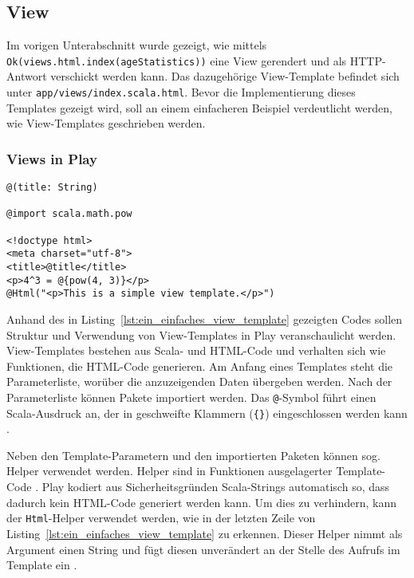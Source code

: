 

\subsection{View} %
\label{sub:view}

Im vorigen Unterabschnitt wurde gezeigt, wie mittels \lstinline|Ok(views.html.index(ageStatistics))| eine View gerendert und als HTTP-Antwort verschickt werden kann.
Das dazugehörige View-Template befindet sich unter \lstinline|app/views/index.scala.html|.
Bevor die Implementierung dieses Templates gezeigt wird, soll an einem einfacheren Beispiel verdeutlicht werden, wie View-Templates geschrieben werden.

\subsubsection{Views in Play} %
\label{ssub:views_in_play}

\begin{lstlisting}[caption=Ein einfaches View-Template, label=lst:ein_einfaches_view_template]
@(title: String)

@import scala.math.pow

<!doctype html>
<meta charset="utf-8">
<title>@title</title>
<p>4^3 = @{pow(4, 3)}</p>
@Html("<p>This is a simple view template.</p>")
\end{lstlisting}

Anhand des in Listing~\ref{lst:ein_einfaches_view_template} gezeigten Codes sollen Struktur und Verwendung von View-Templates in Play veranschaulicht werden.
View-Templates bestehen aus Scala- und HTML-Code und verhalten sich wie Funktionen, die HTML-Code generieren.
Am Anfang eines Templates steht die Parameterliste, worüber die anzuzeigenden Daten übergeben werden.
Nach der Parameterliste können Pakete importiert werden.
Das \lstinline|@|-Symbol führt einen Scala-Ausdruck an, der in geschweifte Klammern (\lstinline|{}|) eingeschlossen werden kann \cite[vgl.][]{play_templates}.

Neben den Template-Parametern und den importierten Paketen können sog. Helper verwendet werden.
Helper sind in Funktionen ausgelagerter Template-Code \cite[vgl.][S.~179]{play_for_scala}.
Play kodiert aus Sicherheitsgründen Scala-Strings automatisch so, dass dadurch kein HTML-Code generiert werden kann.
Um dies zu verhindern, kann der \lstinline|Html|-Helper verwendet werden, wie in der letzten Zeile von Listing~\ref{lst:ein_einfaches_view_template} zu erkennen.
Dieser Helper nimmt als Argument einen String und fügt diesen unverändert an der Stelle des Aufrufs im Template ein \cite[vgl.][]{play_templates}.

